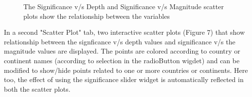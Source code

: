 \documentclass{article}
\begin{document}
		\begin{figure}
			\caption{The Significance v/s Depth and Significance v/s Magnitude scatter plots show the relationship between the variables}
		\end{figure}
		
		In a second "Scatter Plot" tab, two interactive scatter plots (Figure 7) that show relationship between the signficance v/s depth values and significance v/s the magnitude values are displayed. The points are colored according to country or continent names (according to selection in the radioButton wigdet) and can be modified to show/hide points related to one or more countries or continents. Here too, the effect of using the significance slider widget is automatically reflected in both the scatter plots.
	
\end{document}

